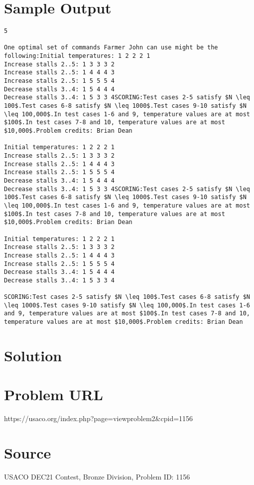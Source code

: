 \documentclass[12pt]{article}
\begin{document}
\section*{Sample Output}
\begin{verbatim}
5

One optimal set of commands Farmer John can use might be the following:Initial temperatures: 1 2 2 2 1
Increase stalls 2..5: 1 3 3 3 2
Increase stalls 2..5: 1 4 4 4 3
Increase stalls 2..5: 1 5 5 5 4
Decrease stalls 3..4: 1 5 4 4 4
Decrease stalls 3..4: 1 5 3 3 4SCORING:Test cases 2-5 satisfy $N \leq 100$.Test cases 6-8 satisfy $N \leq 1000$.Test cases 9-10 satisfy $N \leq 100,000$.In test cases 1-6 and 9, temperature values are at most $100$.In test cases 7-8 and 10, temperature values are at most $10,000$.Problem credits: Brian Dean

Initial temperatures: 1 2 2 2 1
Increase stalls 2..5: 1 3 3 3 2
Increase stalls 2..5: 1 4 4 4 3
Increase stalls 2..5: 1 5 5 5 4
Decrease stalls 3..4: 1 5 4 4 4
Decrease stalls 3..4: 1 5 3 3 4SCORING:Test cases 2-5 satisfy $N \leq 100$.Test cases 6-8 satisfy $N \leq 1000$.Test cases 9-10 satisfy $N \leq 100,000$.In test cases 1-6 and 9, temperature values are at most $100$.In test cases 7-8 and 10, temperature values are at most $10,000$.Problem credits: Brian Dean

Initial temperatures: 1 2 2 2 1
Increase stalls 2..5: 1 3 3 3 2
Increase stalls 2..5: 1 4 4 4 3
Increase stalls 2..5: 1 5 5 5 4
Decrease stalls 3..4: 1 5 4 4 4
Decrease stalls 3..4: 1 5 3 3 4

SCORING:Test cases 2-5 satisfy $N \leq 100$.Test cases 6-8 satisfy $N \leq 1000$.Test cases 9-10 satisfy $N \leq 100,000$.In test cases 1-6 and 9, temperature values are at most $100$.In test cases 7-8 and 10, temperature values are at most $10,000$.Problem credits: Brian Dean
\end{verbatim}

\section*{Solution}


\section*{Problem URL}
https://usaco.org/index.php?page=viewproblem2&cpid=1156

\section*{Source}
USACO DEC21 Contest, Bronze Division, Problem ID: 1156
\end{document}
